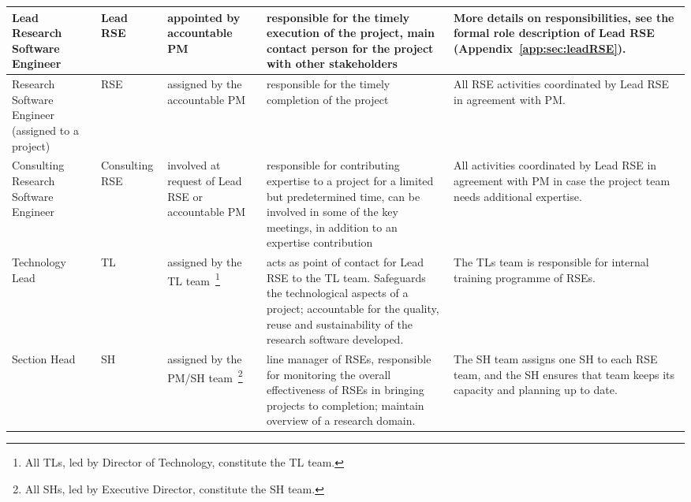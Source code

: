 \documentclass[11pt]{article}
\begin{document}
\begin{tabularx}{\linewidth}{p{}|p{}|p{}|p{}|p{}}
Lead Research Software Engineer                    & Lead RSE              & appointed by accountable PM                                                                                       & responsible for the timely execution of the project, main contact person for the project with other stakeholders                                                                                                                       & More details on responsibilities, see the formal role description of Lead RSE (Appendix~\ref{app:sec:leadRSE}).                                          \\\hline
Research Software Engineer (assigned to a project) & RSE                   & assigned by the accountable PM                                                                                    & responsible for the timely completion of the project                                                                                                                                                                                   & All RSE activities coordinated by Lead RSE in agreement with PM.                                                                     \\\hline
Consulting Research Software Engineer              & Consulting RSE        & involved at request of Lead RSE or accountable PM                                                                 & responsible for contributing expertise to a project for a limited but predetermined time, can be involved in some of the key meetings, in addition to an expertise contribution                                                        & All activities coordinated by Lead RSE in agreement with PM in case the project team needs additional expertise.                     \\\hline
Technology Lead                                    & TL                    & assigned by the TL team~\footnote{All TLs, led by Director of Technology, constitute the TL team.}                                                                                          & acts as point of contact for Lead RSE to the TL team. Safeguards the technological aspects of a project; accountable for the quality, reuse and sustainability of the research software developed.                                     & The TLs team is responsible for internal training programme of RSEs.                                                                 \\\hline
Section Head                                       & SH                    & assigned by the PM/SH team~\footnote{All SHs, led by Executive Director, constitute the SH team.}                                                                                       & line manager of RSEs, responsible for monitoring the overall effectiveness of RSEs in bringing projects to completion; maintain overview of a research domain.                                                                         & The SH team assigns one SH to each RSE team, and the SH ensures that team keeps its capacity and planning up to date.                \\\hline

\end{tabularx}
\end{document}

